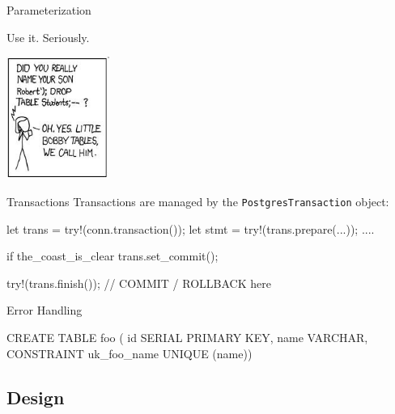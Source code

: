 \documentclass{beamer}
\begin{document}
\begin{frame}[fragile]{Parameterization}
    \begin{center}
        Use it. Seriously.

        \vspace{.75cm}

        \href{http://xkcd.com/327/}{\includegraphics[height=4cm]{bobby_tables.jpg}}
    \end{center}
\end{frame}

\begin{frame}[fragile]{Transactions}
    Transactions are managed by the \verb!PostgresTransaction! object:
    \begin{rustcode}
let trans = try!(conn.transaction());
let stmt = try!(trans.prepare(...));
....

if the_coast_is_clear {
    trans.set_commit();
}

try!(trans.finish()); // COMMIT / ROLLBACK here
    \end{rustcode}
\end{frame}

\begin{frame}[fragile]{Error Handling}
    \begin{sqlcode}
CREATE TABLE foo (
    id SERIAL PRIMARY KEY,
    name VARCHAR,
    CONSTRAINT uk_foo_name UNIQUE (name))
    \end{sqlcode}
\end{frame}

\subsection{Design}
\end{document}
